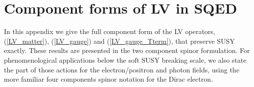 \documentclass[12pt]{revtex4}
\begin{document}



\appendix

\section{Component forms of LV in SQED}
\label{CompLVSQED}

In this appendix we give the full component form of the LV operators,
(\ref{LV_matter}), (\ref{LV_gauge}) and (\ref{LV_gauge_Tterm}), that
preserve SUSY exactly. These results are presented in the two 
component spinor formulation. For phenomenological applications below
the soft SUSY breaking scale, we also state the part of those actions
for the electron/positron and photon fields, using the more familiar
four components spinor notation for the Dirac electron.  
\end{document}
